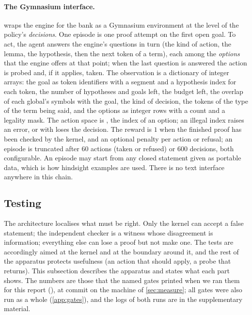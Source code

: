 \paragraph{The Gymnasium interface.}
 wraps the engine for the bank as a Gymnasium environment \citep{towers24,brockman16} at the level of the policy's \emph{decisions}.
One episode is one proof attempt on the first open goal.
To act, the agent answers the engine's questions in turn (the kind of action, the lemma, the hypothesis, then the next token of a term), each among the \emph{options} that the engine offers at that point; when the last question is answered the action is probed and, if it applies, taken.
The observation is a dictionary of integer arrays: the goal as token identifiers with a segment and a hypothesis index for each token, the number of hypotheses and goals left, the budget left, the overlap of each global's symbols with the goal, the kind of decision, the tokens of the type of the term being said, and the options as integer rows with a count and a legality mask.
The action space is , the index of an option; an illegal index raises an error, or with  loses the decision.
The reward is $1$ when the finished proof has been checked by the kernel, and an optional penalty per action or refusal; an episode is truncated after 60 actions (taken or refused) or 600 decisions, both configurable.
An episode may start from any closed statement given as portable data, which is how hindsight examples are used.
There is no text interface anywhere in this chain.

\subsection{Testing}\label{sec:testing}

The architecture localises what must be right.
Only the kernel can accept a false statement; the independent checker is a witness whose disagreement is information; everything else can lose a proof but not make one.
The tests are accordingly aimed at the kernel and at the boundary around it, and the rest of the apparatus protects usefulness (an action that should apply, a probe that returns).
This subsection describes the apparatus and states what each part shows.
The numbers are those that the named gates printed when we ran them for this report (), at commit \mCommit{} on the machine of \cref{sec:measure}; all \gatesAll{} gates were also run as a whole (\cref{app:gates}), and the logs of both runs are in the supplementary material.

